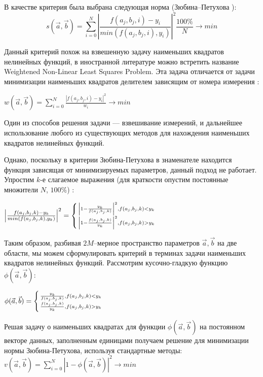 
В качестве критерия была выбрана следующая норма (Зюбина--Петухова ): 
\begin{equation}
	\label{eq:zuybin_petuhov}
	s(\vec{a}, \vec{b}) = \displaystyle\sum_{i=0}^N \left|
	\frac{f(a_j, b_j, i) - y_i}{min(f(a_j, b_j, i), y_i)}\right|^2 
	\frac{100\%}{N} \rightarrow min %
\end{equation}

Данный критерий похож на взвешенную задачу наименьших квадратов 
нелинейных функций, в иностранной литературе можно встретить название 
Weightened Non-Linear Least Squares Problem. Эта задача отличается
от задачи минимизации наименьших квадратов делителем зависящим от номера измерения : 
\begin{center}
$w(\vec{a}, \vec{b}) = \displaystyle\sum_{i=0}^N \frac{\left|f(a_j, b_j, i) - y_i\right|^2}{w_i} \rightarrow min$
\end{center}
Один из способов решения задачи --- взвешивание измерений, и  дальнейшее использование любого из существующих методов для нахождения 
наименьших квадратов нелинейных функций.


Однако, поскольку в критерии Зюбина-Петухова в знаменателе 
находится функция зависящая от минимизируемых параметров, 
данный подход не работает. Упростим $k$-е слагаемое выражения %
(для краткости опустим постоянные множители $N$, $100\%$) : 

\begin{center}
 \LARGE{$ \left|\frac{f(a_j, b_j, k) - y_k}{min(f(a_j, b_j, k), y_k)}\right|^2 = \left\{ {
    \left| 1 - \frac{y_k}{f(a_j, b_j, k)}\right|^2 , f(a_j, b_j, k) < y_k  \atop 
    \left| 1 - \frac{f(a_j, b_j, k)}{y_k}\right|^2 , f(a_j, b_j, k) > y_k  
 } \right. $}
\end{center}

Таким образом, разбивая $ 2 M $--мерное пространство параметров $ \vec{a}, \vec{b}$ на две области, мы можем сформулировать критерий в терминах задачи наименьших квадратов нелинейных функций.
Рассмотрим кусочно-гладкую функцию $\phi(\vec{a}, \vec{b})$: 
\begin{center}
$ \phi(\vec{a}, \vec{b}) = \left\{ {
    \frac{y_k}{f(a_j, b_j, k)} , f(a_j, b_j, k) < y_k  \atop 
    \frac{f(a_j, b_j, k)}{y_k} , f(a_j, b_j, k) > y_k  
 } \right.$
\end{center}

Решая задачу о наименьших квадратах для функции 
$\phi(\vec{a}, \vec{b})$ на постоянном векторе данных, заполненным
единицами получаем решение для минимизации нормы 
Зюбина-Петухова, используя стандартные методы: 
$v(\vec{a}, \vec{b}) = \displaystyle\sum_{i=0}^N \left|1 -
\phi(\vec{a}, \vec{b})\right|^2 \rightarrow min$



